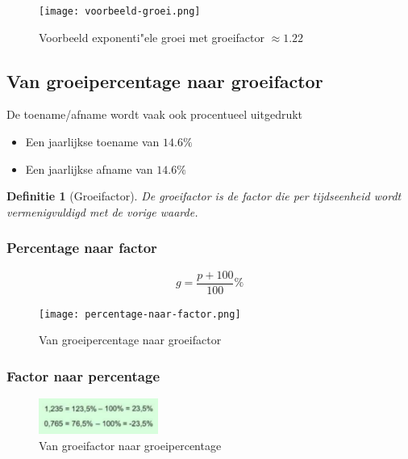 \documentclass{article}
\newtheorem{theorem}{Definitie}[section]
\begin{document}
\begin{figure}[H]
    \centering
    \texttt{[image: voorbeeld-groei.png]}
    \caption{Voorbeeld exponenti"ele groei met groeifactor $\approx 1.22$}
\end{figure}


\subsection{Van groeipercentage naar groeifactor}

De toename/afname wordt vaak ook procentueel uitgedrukt

\begin{itemize}
    \item Een jaarlijkse toename van $14.6\%$
    \item Een jaarlijkse afname van $14.6\%$
\end{itemize}

\begin{theorem}[Groeifactor]
De groeifactor is de factor die per tijdseenheid wordt vermenigvuldigd met de vorige waarde.
\end{theorem}

\subsubsection{Percentage naar factor}

\begin{equation}
g = \frac{p + 100}{100}\%
\end{equation} 

\begin{figure}[H]
    \centering
    \texttt{[image: percentage-naar-factor.png]}
    \caption{Van groeipercentage naar groeifactor}
\end{figure}


\subsubsection{Factor naar percentage}

\begin{figure}[H]
    \centering
    \includegraphics[width=0.35\textwidth]{factor-naar-percentage.png}
    \caption{Van groeifactor naar groeipercentage}
\end{figure}
\end{document}
